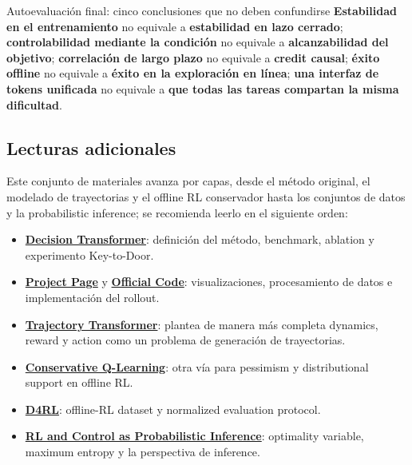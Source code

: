 \documentclass[a4paper]{article}
\begin{document}
\begin{warningbox}{Autoevaluación final: cinco conclusiones que no deben confundirse}
\textbf{Estabilidad en el entrenamiento} no equivale a \textbf{estabilidad en lazo cerrado}; \textbf{controlabilidad mediante la condición} no equivale a \textbf{alcanzabilidad del objetivo}; \textbf{correlación de largo plazo} no equivale a \textbf{credit causal}; \textbf{éxito offline} no equivale a \textbf{éxito en la exploración en línea}; \textbf{una interfaz de tokens unificada} no equivale a \textbf{que todas las tareas compartan la misma dificultad}.
\end{warningbox}

\subsection{Lecturas adicionales}

Este conjunto de materiales avanza por capas, desde el método original, el modelado de trayectorias y el offline RL conservador hasta los conjuntos de datos y la probabilistic inference; se recomienda leerlo en el siguiente orden:

{\small
\begin{itemize}[nosep,leftmargin=*]
  \item \href{https://arxiv.org/abs/2106.01345}{\textbf{Decision Transformer}}: definición del método, benchmark, ablation y experimento Key-to-Door.
  \item \href{https://sites.google.com/berkeley.edu/decision-transformer}{\textbf{Project Page}} y \href{https://github.com/kzl/decision-transformer}{\textbf{Official Code}}: visualizaciones, procesamiento de datos e implementación del rollout.
  \item \href{https://arxiv.org/abs/2106.02039}{\textbf{Trajectory Transformer}}: plantea de manera más completa dynamics, reward y action como un problema de generación de trayectorias.
  \item \href{https://arxiv.org/abs/2006.04779}{\textbf{Conservative Q-Learning}}: otra vía para pessimism y distributional support en offline RL.
  \item \href{https://arxiv.org/abs/2004.07219}{\textbf{D4RL}}: offline-RL dataset y normalized evaluation protocol.
  \item \href{https://arxiv.org/abs/1805.00909}{\textbf{RL and Control as Probabilistic Inference}}: optimality variable, maximum entropy y la perspectiva de inference.
\end{itemize}
}
\end{document}
